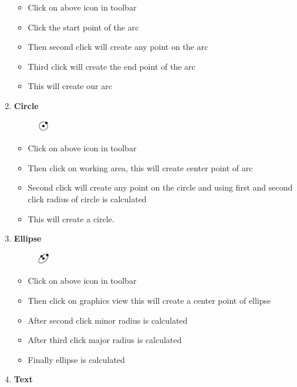 \begin{enumerate}
\begin{figure}[h!]
\end{figure}
\begin{itemize}
\item Click on above icon in toolbar
\item Click the start point of the arc
\item Then second click will create any point on the arc
\item Third click will create the end point of the arc
\item This will create our arc
\end{itemize}
\item \textbf{Circle}
\begin{figure}[h!]
\centering
\includegraphics[width=0.05\textwidth]{images/circle.jpg}\\
\end{figure}
\begin{itemize}
\item Click on above icon in toolbar
\item Then click on working area, this will create center point of arc
\item Second click will create any point on the circle and using first and second click radius of circle is calculated
\item This will create a circle.
\end{itemize}
\item \textbf{Ellipse}
\begin{figure}[h!]
\centering
\includegraphics[width=0.05\textwidth]{images/ellipse.jpg}\\
\end{figure}
\begin{itemize}
\item Click on above icon in toolbar
\item Then click on graphics view this will create a center point of ellipse
\item After second click minor radius is calculated
\item After third click major radius is calculated
\item Finally ellipse is calculated
\end{itemize}
\newpage
\item \textbf{Text}
\begin{figure}[h!]

\end{figure}
\end{enumerate}
